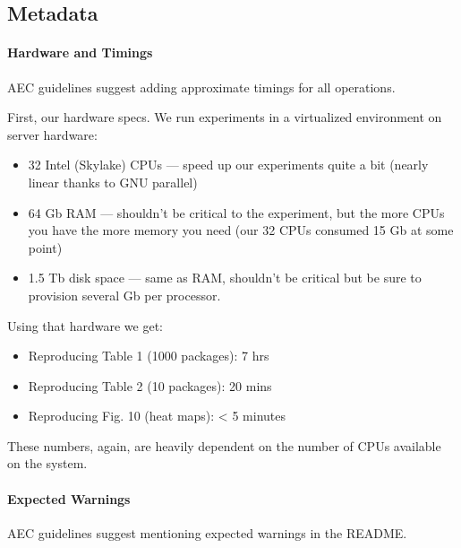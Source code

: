 \documentclass[
]{article}
\providecommand{\tightlist}{%
  \setlength{\itemsep}{0pt}\setlength{\parskip}{0pt}}
\begin{document}
\hypertarget{metadata}{%
\subsection{Metadata}\label{metadata}}

\hypertarget{hardware-and-timings}{%
\paragraph{Hardware and Timings}\label{hardware-and-timings}}

AEC guidelines suggest adding approximate timings for all operations.

First, our hardware specs. We run experiments in a virtualized
environment on server hardware:

\begin{itemize}
\item
  32 Intel (Skylake) CPUs --- speed up our experiments quite a bit
  (nearly linear thanks to GNU parallel)
\item
  64 Gb RAM --- shouldn't be critical to the experiment, but the more
  CPUs you have the more memory you need (our 32 CPUs consumed 15 Gb at
  some point)
\item
  1.5 Tb disk space --- same as RAM, shouldn't be critical but be sure to
  provision several Gb per processor.
\end{itemize}

Using that hardware we get:

\begin{itemize}
\tightlist
\item
  Reproducing Table 1 (1000 packages): 7 hrs
\item
  Reproducing Table 2 (10 packages): 20 mins
\item
  Reproducing Fig. 10 (heat maps): \textless{} 5 minutes
\end{itemize}

These numbers, again, are heavily dependent on the number of CPUs
available on the system.

\hypertarget{expected-warnings}{%
\paragraph{Expected Warnings}\label{expected-warnings}}

AEC guidelines suggest mentioning expected warnings in the README.
\end{document}
